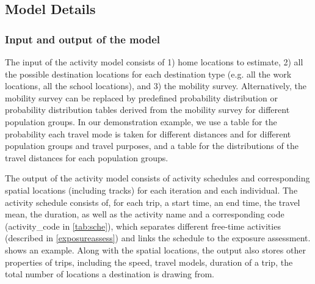 \documentclass[]{article}
\begin{document}
\subsection{Model Details}
\subsubsection{Input and output of the model}

The input of the activity model consists of 1) home locations to estimate, 2) all the possible destination locations for each destination type (e.g. all the work locations, all the school locations), and 3) the mobility survey. Alternatively, the mobility survey can be replaced by predefined probability distribution or probability distribution tables derived from the mobility survey for different population groups. In our demonstration example, we use a table for the probability each travel mode is taken for different distances and for different population groups and travel purposes, and a table for the distributions of the travel distances for each population groups.
 

The output of the activity model consists of activity schedules and corresponding spatial locations (including tracks) for each iteration and each individual. The activity schedule consists of, for each trip, a start time, an end time, the travel mean, the duration, as well as the activity name and a corresponding code (activity\_code in \cref{tab:sche}), which separates different free-time activities (described in \cref{exposureassess}) and links the schedule to the exposure assessment.  shows an example. Along with the spatial locations, the output also stores other properties of trips, including the speed, travel models, duration of a trip, the total number of locations a destination is drawing from.
\end{document}
